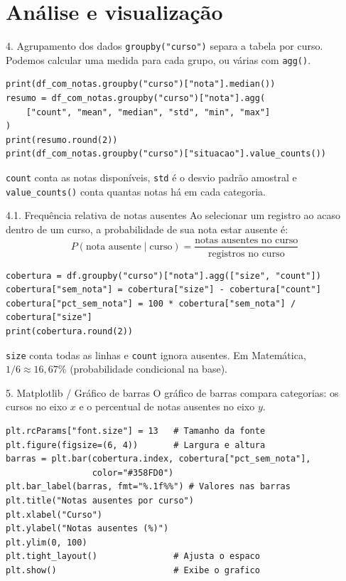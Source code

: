 \section{Análise e visualização}

\begin{frame}[fragile,t,label=cd-analise]{4. Agrupamento dos dados}
\texttt{groupby("curso")} separa a tabela por curso. Podemos calcular uma medida para cada grupo, ou várias com \texttt{agg()}.
\begin{lstlisting}
print(df_com_notas.groupby("curso")["nota"].median())
resumo = df_com_notas.groupby("curso")["nota"].agg(
    ["count", "mean", "median", "std", "min", "max"]
)
print(resumo.round(2))
print(df_com_notas.groupby("curso")["situacao"].value_counts())
\end{lstlisting}
\begin{EMASCnote}
\texttt{count} conta as notas disponíveis, \texttt{std} é o desvio padrão amostral e \texttt{value\_counts()} conta quantas notas há em cada categoria.
\end{EMASCnote}
\end{frame}

\begin{frame}[fragile,t]{4.1. Frequência relativa de notas ausentes}
Ao selecionar um registro ao acaso dentro de um curso, a probabilidade de sua nota estar ausente é:
\[
  P(\text{nota ausente}\mid\text{curso}) =
  \frac{\text{notas ausentes no curso}}{\text{registros no curso}}
\]
\begin{lstlisting}
cobertura = df.groupby("curso")["nota"].agg(["size", "count"])
cobertura["sem_nota"] = cobertura["size"] - cobertura["count"]
cobertura["pct_sem_nota"] = 100 * cobertura["sem_nota"] / cobertura["size"]
print(cobertura.round(2))
\end{lstlisting}
\begin{EMASCnote}
\texttt{size} conta todas as linhas e \texttt{count} ignora ausentes. Em Matemática, $1/6\approx 16{,}67\%$ (probabilidade condicional na base).
\end{EMASCnote}
\end{frame}

\begin{frame}[fragile,t]{5. Matplotlib / Gráfico de barras}
O gráfico de barras compara categorias: os cursos no eixo $x$ e o percentual de notas ausentes no eixo $y$.
\begin{lstlisting}
plt.rcParams["font.size"] = 13   # Tamanho da fonte
plt.figure(figsize=(6, 4))       # Largura e altura
barras = plt.bar(cobertura.index, cobertura["pct_sem_nota"],
                 color="#358FD0")
plt.bar_label(barras, fmt="%.1f%%") # Valores nas barras
plt.title("Notas ausentes por curso")
plt.xlabel("Curso")
plt.ylabel("Notas ausentes (%)")
plt.ylim(0, 100)
plt.tight_layout()               # Ajusta o espaco
plt.show()                       # Exibe o grafico
\end{lstlisting}
\end{frame}

